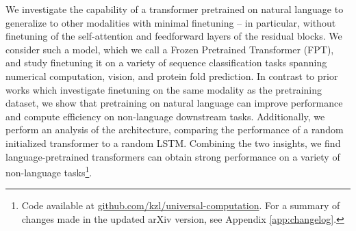 
We investigate the capability of a transformer pretrained on natural language to generalize to other modalities with minimal finetuning -- in particular, without finetuning of the self-attention and feedforward layers of the residual blocks.
We consider such a model, which we call a Frozen Pretrained Transformer (FPT), and study finetuning it on a variety of sequence classification tasks spanning numerical computation, vision, and protein fold prediction.
In contrast to prior works which investigate finetuning on the same modality as the pretraining dataset, we show that pretraining on natural language can improve performance and compute efficiency on non-language downstream tasks.
Additionally, we perform an analysis of the architecture, comparing the performance of a random initialized transformer to a random LSTM.
Combining the two insights, we find language-pretrained transformers can obtain strong performance on a variety of non-language tasks\footnote{
Code available at \href{https://github.com/kzl/universal-computation}{github.com/kzl/universal-computation}.
For a summary of changes made in the updated arXiv version, see Appendix \ref{app:changelog}.
}.
